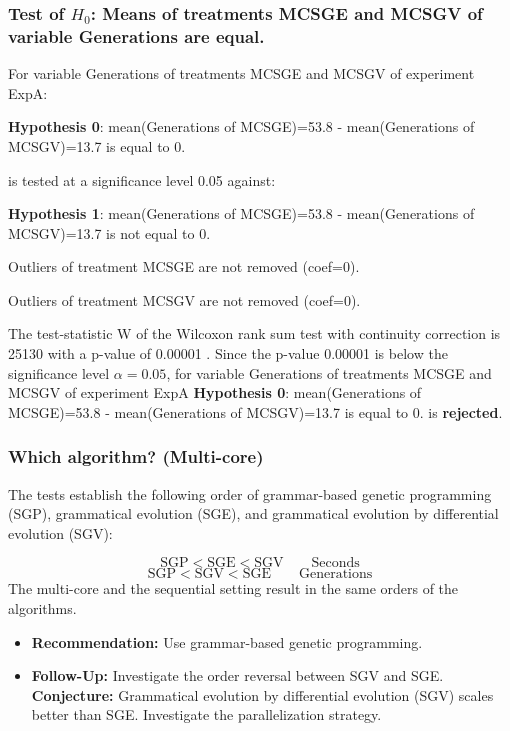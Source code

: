 \documentclass[18pt,c]{beamer}
\makeatletter
\let\beamer@writeslidentry@miniframeson=\beamer@writeslidentry
\newcommand*{\miniframeson}{\let\beamer@writeslidentry=\beamer@writeslidentry@miniframeson}
\makeatother
\begin{document}
\begin{frame}[t]
 \frametitle{Test of $H_{0}$: Means of treatments MCSGE and MCSGV of variable Generations are equal. }
 \scriptsize
 For variable Generations of treatments MCSGE and MCSGV of experiment ExpA:

\vspace{1mm}
{\bf Hypothesis 0}: mean(Generations of MCSGE)=53.8 - mean(Generations of MCSGV)=13.7 is equal to 0.


 \begin{center} is tested at a significance level 0.05 against: \end{center}

{\bf Hypothesis 1}: mean(Generations of MCSGE)=53.8 - mean(Generations of MCSGV)=13.7 is not equal to 0.
\vspace{1mm}
\vspace{1mm}

 Outliers of treatment MCSGE  are not removed (coef=0).

 Outliers of treatment MCSGV  are not removed (coef=0).
\vspace{1mm}
 
 The test-statistic W of the Wilcoxon rank sum test with continuity correction is 25130 with a p-value of 0.00001 .
 Since the p-value 0.00001 is below the significance level $\alpha= 0.05 $,
 for variable Generations of treatments MCSGE and MCSGV of experiment ExpA 
 {\bf Hypothesis 0}: mean(Generations of MCSGE)=53.8 - mean(Generations of MCSGV)=13.7 is equal to 0.
is {\bf rejected}.

 \end{frame}
\begin{frame}
\frametitle{
Which algorithm? (Multi-core)
}
\scriptsize 
The tests establish the following order of grammar-based genetic programming (SGP), 
grammatical evolution (SGE), and grammatical evolution by differential evolution (SGV):
 
\begin{displaymath}
\mbox{SGP} < \mbox{SGE} < \mbox{SGV} \quad\quad \mbox{Seconds}
\end{displaymath}
\begin{displaymath}
\mbox{SGP} < \mbox{SGV} < \mbox{SGE} \quad\quad \mbox{Generations}
\end{displaymath}
The multi-core and the sequential setting result in the same orders of the algorithms.
 
\vspace{2mm} 
\begin{itemize}
\item {\bf Recommendation:} Use grammar-based genetic programming.
\item {\bf Follow-Up:} Investigate the order reversal between SGV and SGE.
 {\bf Conjecture:} Grammatical evolution by differential evolution (SGV) scales better than SGE.
 Investigate the parallelization strategy.
\end{itemize}
\end{frame}%
\miniframeson
\end{document}
